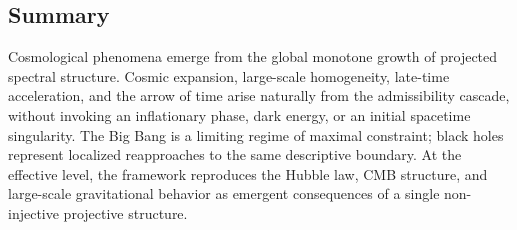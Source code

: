 \subsection{Summary}
  \label{subsec:summary-cosmology}

  Cosmological phenomena emerge from the global monotone growth of
  projected spectral structure.
  Cosmic expansion, large-scale homogeneity, late-time acceleration, and
  the arrow of time arise naturally from the admissibility cascade, without
  invoking an inflationary phase, dark energy, or an initial spacetime
  singularity.
  The Big Bang is a limiting regime of maximal constraint; black holes
  represent localized reapproaches to the same descriptive boundary.
  At the effective level, the framework reproduces the Hubble law, CMB
  structure, and large-scale gravitational behavior as emergent
  consequences of a single non-injective projective structure.
